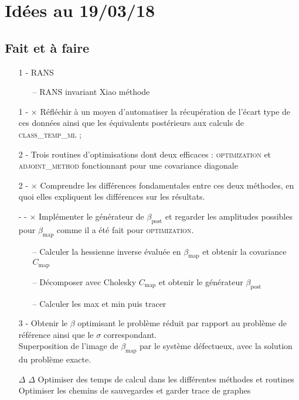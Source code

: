 \documentclass[a4paper,12pt]{article}
\newcommand\bk{\color{black}}
\newcommand\navy{\color{navy}}
\newcommand{\done}{\color{green} \textbf{\checkmark} \color{black}}
\newcommand{\todo}{\color{red} \textbf{$\times$} \color{black}}
\newcommand{\warn}{\color{orange} \textbf{$\Delta$} \color{black}}
\numberwithin{equation}{section} %
\begin{document}
\pagebreak

\section*{Idées au 19/03/18}
\navy \subsection*{Fait et à faire } \bk
\begin{itemize}
	\item[1 - ] RANS
	\begin{itemize}
		\item[--] RANS invariant Xiao méthode 
	\end{itemize}
	\item[1 - \todo] Réfléchir à un moyen d'automatiser la récupération de l'écart type de ces données ainsi que les équivalents postérieurs aux calculs de \textsc{class\_temp\_ml} ; \\

	\item[2 - \done] Trois routines d'optimisations dont deux efficaces : \textsc{optimization} et \textsc{adjoint\_method} fonctionnant pour une covariance diagonale
	\item[2 - \todo] Comprendre les différences fondamentales entre ces deux méthodes, en quoi elles expliquent les différences sur les résultats.
	\item[- - \todo] Implémenter le générateur de $\beta_{\text{post}}$ et regarder les amplitudes possibles pour $\beta_{\text{map}}$ comme il a été fait pour \textsc{optimization}.
	\begin{itemize}
		\item[--] Calculer la hessienne inverse évaluée en $\beta_{\text{map}} $ et obtenir la covariance $C_{\text{map}}$
		\item[--] Décomposer avec Cholesky $C_{\text{map}}$ et obtenir le générateur $\beta_{\text{post}}$
		\item[--] Calculer les max et min puis tracer  \\
	\end{itemize}
	
	\item[3 - \done] Obtenir le $\beta$ optimisant le problème réduit par rapport au problème de référence ainsi que le $\sigma$ correspondant. \\
	Superposition de l'image de $\beta_{\text{map}}$ par le système défectueux, avec la solution du problème exacte. \\
	
	\item[\warn \warn] Optimiser des temps de calcul dans les différentes méthodes et routines \\
	Optimiser les chemins de sauvegardes et garder trace de graphes
	
\end{itemize}
\end{document}
